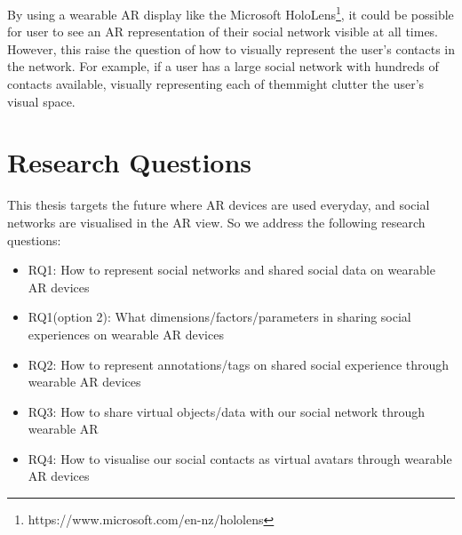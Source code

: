 By using a wearable AR display like the Microsoft HoloLens\footnote{https://www.microsoft.com/en-nz/hololens}, it could be possible for user to see an AR representation of their social network visible at all times. However, this raise the question of how to visually represent the user's contacts in the network. For example, if a user has a large social network with hundreds of contacts available, visually representing each of themmight clutter the user's visual space.



\section{Research Questions}

This thesis targets the future where AR devices are used everyday, and social networks are visualised in the AR view. So we address the following research questions: 

\begin{itemize}
    \item RQ1: How to represent social networks and shared social data on wearable AR devices 
    
    \item RQ1(option 2): What dimensions/factors/parameters in sharing social experiences on wearable AR devices 
    
    \item RQ2: How to represent annotations/tags on shared social experience through wearable AR devices
    
    \item RQ3: How to share virtual objects/data with our social network through wearable AR 
    
    \item RQ4: How to visualise our social contacts as virtual avatars through wearable AR devices

\end{itemize}

